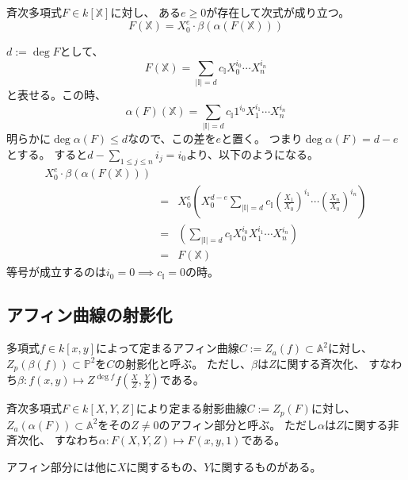 \documentclass[a4]{article}
\newcommand{\affine}{\mathbb{A}}
\newcommand{\proj}{\mathbb{P}}
\begin{document}
        \begin{Lemma}
            斉次多項式$F \in k[\mathbb{X}]$に対し、
            ある$e \geq 0$が存在して次式が成り立つ。
            \[ F(\mathbb{X}) = X_0^e \cdot \beta(\alpha(F(\mathbb{X})))\]
        \end{Lemma}
        \begin{Proof}
            $d:=\deg F$として、
            \[ F(\mathbb{X}) = \sum_{|\mathbb{I}|=d}{c_{\mathbb{I}} X_0^{i_0} \cdots X_n^{i_n}}\]
            と表せる。この時、
            \[ \alpha(F)(\mathbb{X}) = \sum_{|\mathbb{I}|=d}{c_{\mathbb{I}} 1^{i_0} X_1^{i_1} \cdots X_n^{i_n}}\]
            明らかに$\deg \alpha(F) \leq d$なので、この差を$e$と置く。
            つまり$\deg \alpha(F)=d-e$とする。
            すると$d-\sum_{1 \leq j \leq n}{i_j}=i_0$より、以下のようになる。
            \begin{eqnarray*}
                X_0^e \cdot \beta(\alpha(F(\mathbb{X}))) \\
                &=& X_0^e
                \left(
                    X_0^{d-e}
                    \sum_{|\mathbb{I}|=d}{c_{\mathbb{I}} \left(\frac{X_1}{X_0}\right)^{i_1} \cdots \left(\frac{X_n}{X_0}\right)^{i_n}}
                \right) \\
                &=&
                \left(
                    \sum_{|\mathbb{I}|=d}{c_{\mathbb{I}} X_0^{i_0} X_1^{i_1} \cdots X_n^{i_n}}
                \right) \\
                &=& F(\mathbb{X})
            \end{eqnarray*}
            等号が成立するのは$i_0=0 \implies c_{\mathbb{I}}=0$の時。
            \QED
        \end{Proof}

        \subsection{アフィン曲線の射影化}
        \begin{Def}
            多項式$f \in k[x,y]$によって定まるアフィン曲線$C:=Z_a(f) \subset \affine^2$に対し、
            $Z_p(\beta(f)) \subset \proj^2$を$C$の射影化と呼ぶ。
            ただし、$\beta$は$Z$に関する斉次化、
            すなわち$\beta : f(x, y) \mapsto Z^{\deg f}f \left( \frac{X}{Z},\frac{Y}{Z}\right)$である。
        \end{Def}

        \begin{Def}
            斉次多項式$F \in k[X, Y, Z]$により定まる射影曲線$C:=Z_p(F)$に対し、
            $Z_a(\alpha(F)) \subset \affine^2$をその$Z \neq 0$のアフィン部分と呼ぶ。
            ただし$\alpha$は$Z$に関する非斉次化、
            すなわち$\alpha : F(X, Y, Z) \mapsto F(x, y, 1)$である。
        \end{Def}
        アフィン部分には他に$X$に関するもの、$Y$に関するものがある。
\end{document}
